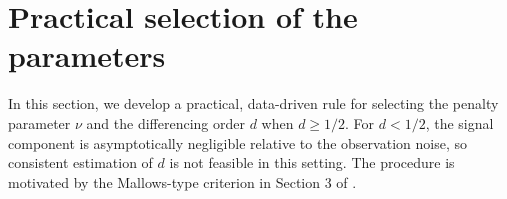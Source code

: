 \documentclass[11pt]{article}
\newtheorem{remark}[theorem]{Remark}
\numberwithin{equation}{section}
\numberwithin{figure}{section}
\begin{document}
%
%
%

\section{ Practical selection of the parameters}\label{sec_selectionofparameters}

In this section, we develop a practical, data-driven rule for selecting the
penalty parameter \(\nu\) and the differencing order \(d\) when
\(d\geq1/2\).  For $d < 1/2$, the signal component is asymptotically
negligible relative to the observation noise, so consistent estimation of
$d$ is not feasible in this setting. The procedure is motivated by the Mallows-type criterion in
Section 3 of \cite{burman_shumway2009estimation}.
\end{document}
